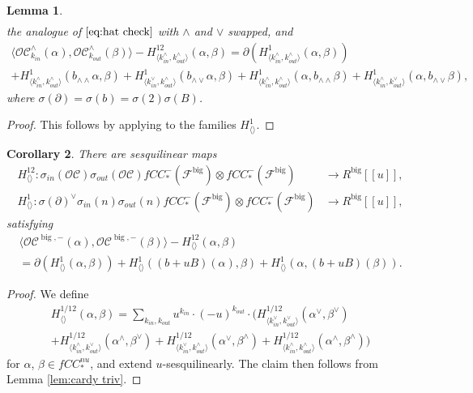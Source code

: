 \documentclass{article}
\newtheorem{lem}{Lemma}[section]
\newtheorem{cor}[lem]{Corollary}
\def\fuk{\EuF}
\def\cO{\mathcal{O}}
\def\cC{\mathcal{C}}
\def\fuk{\mathcal{F}}
\def\big{{\operatorname{big}}}
\begin{document}
\begin{lem}
\begin{multline}
    \end{multline}
    the analogue of $\eqref{eq:hat check}$ with $\wedge$ and $\vee$ swapped, and
    \begin{multline}
        \langle \cO\cC^\wedge_{k_{in}}(\alpha),\cO\cC^\wedge_{k_{out}}(\beta) \rangle - H^{12}_{\langle  k^\wedge_{in},k^\wedge_{out}\rangle}(\alpha,\beta) = \partial(H^1_{\langle k^\wedge_{in},k^\wedge_{out}\rangle}(\alpha,\beta)) \\+ H^1_{\langle k^\wedge_{in},k^\wedge_{out}\rangle}(b_{\wedge\wedge}\alpha,\beta) + H^1_{\langle k^\vee_{in},k^\wedge_{out}\rangle}(b_{\wedge\vee}\alpha,\beta) + H^1_{\langle k^\wedge_{in},k^\wedge_{out}\rangle}(\alpha,b_{\wedge\wedge}\beta) + H^1_{\langle k^\wedge_{in},k^\vee_{out}\rangle}(\alpha,b_{\wedge\vee}\beta),
    \end{multline}
    where $\sigma(\partial) = \sigma(b) = \sigma(2)\sigma(B)$.
\end{lem}
\begin{proof}
    This follows by applying \cite[Lemma 4.18]{relfukii} to the families $H^1_{\langle\rangle}$. 
\end{proof}

\begin{cor}\label{cor:cardy 1}
    There are sesquilinear maps
    \begin{align*}
        H^{12}_{\langle\rangle}: \sigma_{in}(\cO\cC)\sigma_{out}(\cO\cC)fCC_*^-(\fuk^\big) \otimes fCC_*^-(\fuk^\big) & \to R^\big[[u]],\\
        H^1_{\langle\rangle}: \sigma(\partial)^\vee\sigma_{in}(n)\sigma_{out}(n)fCC_*^-(\fuk^\big) \otimes fCC_*^-(\fuk^\big) & \to R^\big[[u]],
    \end{align*}
    satisfying
    \begin{multline}
        \langle \cO\cC^{\big,-}(\alpha),\cO\cC^{\big,-}(\beta)\rangle - H^{12}_{\langle\rangle}(\alpha,\beta) \\= \partial(H^1_{\langle\rangle}(\alpha,\beta)) + H^1_{\langle\rangle}((b+uB)(\alpha),\beta) + H^1_{\langle\rangle}(\alpha,(b+uB)(\beta)).
    \end{multline}
\end{cor}
\begin{proof}
    We define
    \begin{multline}\label{eq:put the us}
        H^{1/12}_{\langle\rangle}(\alpha,\beta) = \sum_{k_{in},k_{out}} u^{k_{in}}\cdot(-u)^{k_{out}} \cdot (H^{1/12}_{\langle k^\vee_{in},k^\vee_{out}\rangle}(\alpha^\vee,\beta^\vee) \\
        + H^{1/12}_{\langle k^\wedge_{in},k^\vee_{out}\rangle}(\alpha^\wedge,\beta^\vee) + H^{1/12}_{\langle k^\vee_{in},k^\wedge_{out}\rangle}(\alpha^\vee,\beta^\wedge) + H^{1/12}_{\langle k^\wedge_{in},k^\wedge_{out}\rangle}(\alpha^\wedge,\beta^\wedge))
    \end{multline}
    for $\alpha$, $\beta \in fCC_*^{nu}$, and extend $u$-sesquilinearly. 
    The claim then follows from Lemma \ref{lem:cardy triv}. 
\end{proof}
\end{document}
